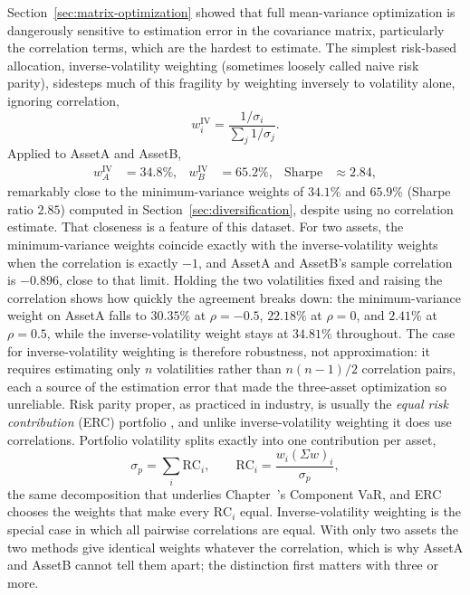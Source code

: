 \documentclass[../ai_in_finance]{subfiles}
\begin{document}
Section~\ref{sec:matrix-optimization} showed that full mean-variance optimization is dangerously sensitive to estimation error in the covariance matrix, particularly the correlation terms, which are the hardest to estimate. The simplest risk-based allocation, inverse-volatility weighting (sometimes loosely called naive risk parity), sidesteps much of this fragility by weighting inversely to volatility alone, ignoring correlation,
\begin{equation*}
w_i^{\text{IV}} = \frac{1/\sigma_i}{\sum_j 1/\sigma_j}.
\end{equation*}
Applied to AssetA and AssetB,
\begin{align*}
w_A^{\text{IV}} &= 34.8\%, & w_B^{\text{IV}} &= 65.2\%, & \text{Sharpe} &\approx 2.84,
\end{align*}
remarkably close to the minimum-variance weights of $34.1\%$ and $65.9\%$ (Sharpe ratio $2.85$) computed in Section~\ref{sec:diversification}, despite using no correlation estimate.
That closeness is a feature of this dataset. For two assets, the minimum-variance weights coincide exactly with the inverse-volatility weights when the correlation is exactly $-1$, and AssetA and AssetB's sample correlation is $-0.896$, close to that limit. Holding the two volatilities fixed and raising the correlation shows how quickly the agreement breaks down: the minimum-variance weight on AssetA falls to $30.35\%$ at $\rho=-0.5$, $22.18\%$ at $\rho=0$, and $2.41\%$ at $\rho=0.5$, while the inverse-volatility weight stays at $34.81\%$ throughout. The case for inverse-volatility weighting is therefore robustness, not approximation: it requires estimating only $n$ volatilities rather than $n(n-1)/2$ correlation pairs, each a source of the estimation error that made the three-asset optimization so unreliable.
Risk parity proper, as practiced in industry, is usually the \emph{equal risk contribution} (ERC) portfolio \parencite{maillard2010properties}, and unlike inverse-volatility weighting it does use correlations. Portfolio volatility splits exactly into one contribution per asset,
\begin{equation}
\sigma_p = \sum_i \text{RC}_i, \qquad \text{RC}_i = \frac{w_i(\Sigma w)_i}{\sigma_p},
\label{eq:portfolio-risk-contribution}
\end{equation}
the same decomposition that underlies Chapter~'s Component VaR, and ERC chooses the weights that make every $\text{RC}_i$ equal. Inverse-volatility weighting is the special case in which all pairwise correlations are equal. With only two assets the two methods give identical weights whatever the correlation, which is why AssetA and AssetB cannot tell them apart; the distinction first matters with three or more.
\end{document}
